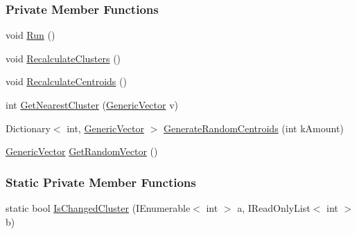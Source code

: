 \subsubsection*{Private Member Functions}
\begin{DoxyCompactItemize}
\item 
void \hyperlink{classDataTools_1_1clustering_1_1Kmeans_aa3eca255b6be227d7d901cc2a72017a5_aa3eca255b6be227d7d901cc2a72017a5}{Run} ()
\item 
void \hyperlink{classDataTools_1_1clustering_1_1Kmeans_a348b17d6f4e97ca727ba1c9dad533d2b_a348b17d6f4e97ca727ba1c9dad533d2b}{Recalculate\+Clusters} ()
\item 
void \hyperlink{classDataTools_1_1clustering_1_1Kmeans_a7fff9b4f946273bc93e33a468c23d1a8_a7fff9b4f946273bc93e33a468c23d1a8}{Recalculate\+Centroids} ()
\item 
int \hyperlink{classDataTools_1_1clustering_1_1Kmeans_a0b0bf52405efb95800cf147176b85c4e_a0b0bf52405efb95800cf147176b85c4e}{Get\+Nearest\+Cluster} (\hyperlink{classDataTools_1_1GenericVector}{Generic\+Vector} v)
\item 
Dictionary$<$ int, \hyperlink{classDataTools_1_1GenericVector}{Generic\+Vector} $>$ \hyperlink{classDataTools_1_1clustering_1_1Kmeans_a9000ebd9a16ff504a2a0ffb139871fba_a9000ebd9a16ff504a2a0ffb139871fba}{Generate\+Random\+Centroids} (int k\+Amount)
\item 
\hyperlink{classDataTools_1_1GenericVector}{Generic\+Vector} \hyperlink{classDataTools_1_1clustering_1_1Kmeans_adb45b460ab8312abb30b509c15fd91fb_adb45b460ab8312abb30b509c15fd91fb}{Get\+Random\+Vector} ()
\end{DoxyCompactItemize}
\subsubsection*{Static Private Member Functions}
\begin{DoxyCompactItemize}
\item 
static bool \hyperlink{classDataTools_1_1clustering_1_1Kmeans_a9347cabe7e34cd6847d27df3d275195d_a9347cabe7e34cd6847d27df3d275195d}{Is\+Changed\+Cluster} (I\+Enumerable$<$ int $>$ a, I\+Read\+Only\+List$<$ int $>$ b)
\end{DoxyCompactItemize}
